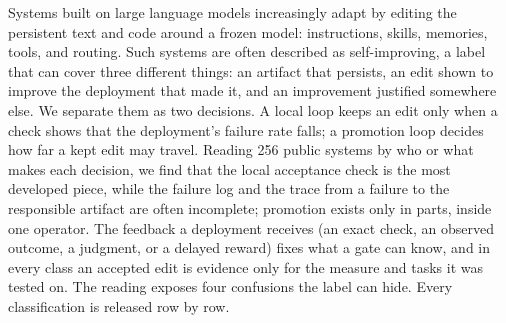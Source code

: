 Systems built on large language models increasingly adapt by editing the persistent text and code around a frozen model: instructions, skills, memories, tools, and routing. Such systems are often described as self-improving, a label that can cover three different things: an artifact that persists, an edit shown to improve the deployment that made it, and an improvement justified somewhere else. We separate them as two decisions. A local loop keeps an edit only when a check shows that the deployment's failure rate falls; a promotion loop decides how far a kept edit may travel. Reading 256 public systems by who or what makes each decision, we find that the local acceptance check is the most developed piece, while the failure log and the trace from a failure to the responsible artifact are often incomplete; promotion exists only in parts, inside one operator. The feedback a deployment receives (an exact check, an observed outcome, a judgment, or a delayed reward) fixes what a gate can know, and in every class an accepted edit is evidence only for the measure and tasks it was tested on. The reading exposes four confusions the label can hide. Every classification is released row by row.
